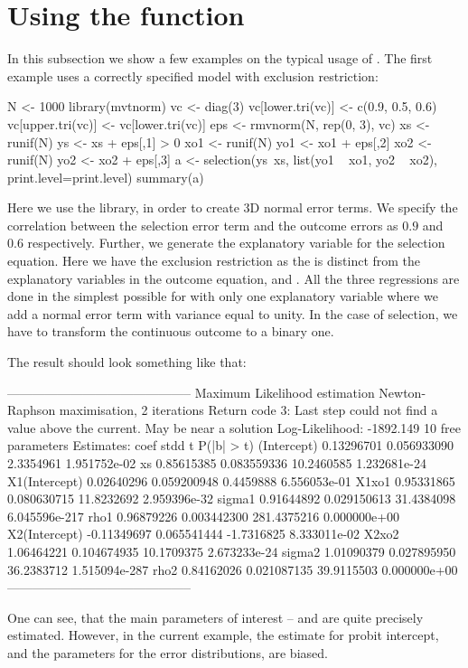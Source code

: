 \section[Usage]{Using the  function}

In this subsection we show a few examples on the typical usage of
.  The first example uses a correctly specified model
with exclusion restriction:

\begin{Code}
  N <- 1000
  library(mvtnorm)
  vc <- diag(3)
  vc[lower.tri(vc)] <- c(0.9, 0.5, 0.6)
  vc[upper.tri(vc)] <- vc[lower.tri(vc)]
  eps <- rmvnorm(N, rep(0, 3), vc)
  xs <- runif(N)
  ys <- xs + eps[,1] > 0
  xo1 <- runif(N)
  yo1 <- xo1 + eps[,2]
  xo2 <- runif(N)
  yo2 <- xo2 + eps[,3]
  a <- selection(ys~xs, list(yo1 ~ xo1, yo2 ~ xo2), print.level=print.level)
  summary(a)
\end{Code}

Here we use the  library, in order to create 3D normal
error terms.  We specify the correlation between the selection error
term and the outcome errors as $0.9$ and $0.6$ respectively.  Further,
we generate the explanatory variable  for the selection
equation.  Here we have the exclusion restriction as the  is
distinct from the explanatory variables in the outcome equation,
 and .  All the three regressions are done in the
simplest possible for with only one explanatory variable where we add
a normal error term with variance equal to unity.  In the case of
selection, we have to transform the continuous outcome to a binary
one.

The result should look something like that:
\begin{Code}
   --------------------------------------------
   Maximum Likelihood estimation
   Newton-Raphson maximisation, 2 iterations
   Return code 3: Last step could not find a value above the current.
   May be near a solution
   Log-Likelihood: -1892.149 
   10  free parameters
   Estimates:
   coef        stdd           t    P(|b| > t)
   (Intercept)    0.13296701 0.056933090   2.3354961  1.951752e-02
   xs             0.85615385 0.083559336  10.2460585  1.232681e-24
   X1(Intercept)  0.02640296 0.059200948   0.4459888  6.556053e-01
   X1xo1          0.95331865 0.080630715  11.8232692  2.959396e-32
   sigma1         0.91644892 0.029150613  31.4384098 6.045596e-217
   rho1           0.96879226 0.003442300 281.4375216  0.000000e+00
   X2(Intercept) -0.11349697 0.065541444  -1.7316825  8.333011e-02
   X2xo2          1.06464221 0.104674935  10.1709375  2.673233e-24
   sigma2         1.01090379 0.027895950  36.2383712 1.515094e-287
   rho2           0.84162026 0.021087135  39.9115503  0.000000e+00
   --------------------------------------------
\end{Code}
One can see, that the main parameters of interest --  and
 are quite precisely estimated.  However, in the current
example, the estimate for probit intercept, and the parameters for the
error distributions, are biased.
